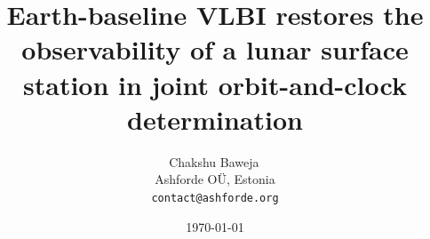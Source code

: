 \documentclass[11pt]{article}
\title{\textbf{Earth-baseline VLBI restores the observability of a lunar
surface station in joint orbit-and-clock determination}}
\author{Chakshu Baweja\,\orcidlink{0009-0008-2098-0751}\\
\small Ashforde O\"U, Estonia \\
\small \texttt{contact@ashforde.org}}
\date{\today}
\begin{document}
\maketitle

\begin{abstract}

\end{abstract}
















\end{document}
